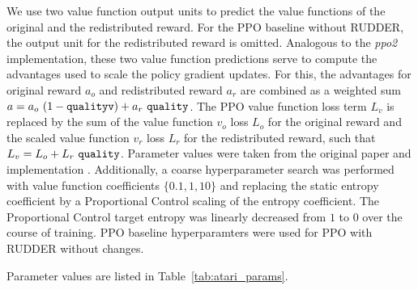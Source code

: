 \documentclass{article}
\begin{document}
\begin{appendices}
We use two value function output units to predict the value functions of 
the original and the redistributed reward.
For the PPO baseline without RUDDER, the output unit for the redistributed reward is omitted.
Analogous to the {\em ppo2} implementation, these two value function predictions 
serve to compute the advantages used to scale the policy gradient updates.
For this, the advantages for original reward $a_{o}$ and redistributed reward $a_{r}$ are combined
as a weighted sum $a = a_{o} \  (1 - \text{\tt qualityv}) + a_{r} \ \text{\tt quality}$.
The PPO value function loss term $L_{v}$ is replaced by the sum of the value function $v_o$
loss $L_{o}$ for the original reward  and
the scaled value function $v_r$ loss $L_{r}$ for the redistributed reward,
such that $L_{v} = L_{o} + L_{r} \ \text{\tt quality}$.
Parameter values were taken from
the original paper \cite{Schulman:17} and implementation \cite{Dhariwal:17}.
Additionally, a coarse hyperparameter search was performed with value function coefficients 
$\{0.1, 1, 10\}$
and replacing the static entropy coefficient by a Proportional Control scaling of 
the entropy coefficient.
The Proportional Control target entropy was linearly decreased from $1$ to $0$ over 
the course of training.
PPO baseline hyperparamters were used for PPO with RUDDER without changes.

Parameter values are listed in Table~\ref{tab:atari_params}.


\end{appendices}
\end{document}
